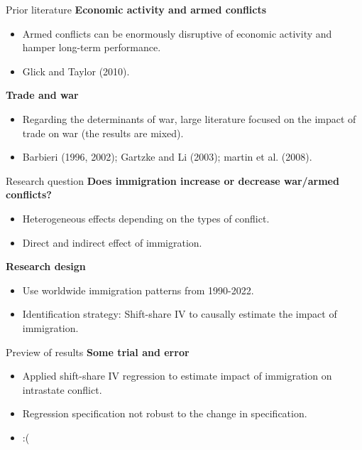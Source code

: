 \documentclass[notes,11pt, aspectratio=169]{beamer}
\begin{document}
\begin{frame}{Prior literature}
	\textbf{Economic activity and armed conflicts}
\begin{itemize}
	\item Armed conflicts can be enormously disruptive of economic activity and hamper long-term performance.
	\item Glick and Taylor (2010).
\end{itemize}\vspace{1em}

\textbf{Trade and war}
\begin{itemize}
	\item Regarding the determinants of war, large literature focused on the impact of trade on war (the results are mixed).
	\item Barbieri (1996, 2002); Gartzke and Li (2003); martin et al. (2008).
\end{itemize}
\end{frame}

\begin{frame}{Research question}
	\textbf{Does immigration increase or decrease war/armed conflicts?}	
	\begin{itemize}
		\item Heterogeneous effects depending on the types of conflict.
		\item Direct and indirect effect of immigration.
	\end{itemize}\vspace{1em}

	\textbf{Research design}
	\begin{itemize}
		\item Use worldwide immigration patterns from 1990-2022.
		\item Identification strategy: Shift-share IV to causally estimate the impact of immigration.
	\end{itemize}
\end{frame}

\begin{frame}{Preview of results}
	\textbf{Some trial and error}
	\begin{itemize}
		\item Applied shift-share IV regression to estimate impact of immigration on intrastate conflict.
		\item Regression specification not robust to the change in specification.
		\item :(
	\end{itemize}
\end{frame}
\end{document}
